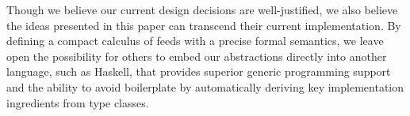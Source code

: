 Though we believe our current design decisions are well-justified,
we also believe the ideas presented in this paper can transcend
their current implementation.  By defining a compact calculus of feeds 
with a precise formal semantics, we leave open the possibility for
others to embed our abstractions directly into another language,
such as Haskell, that provides superior generic programming support
and the ability to avoid boilerplate by automatically deriving 
key implementation ingredients from type classes.
